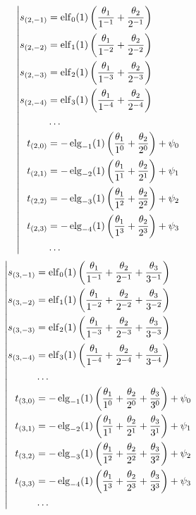 \begin{equation*} \left| \begin{aligned}
s_{(2,-1)} &=
  \elf_0(1) \left(
  \frac{\theta_1}{1^{-1}}
+ \frac{\theta_2}{2^{-1}} \right) \\
%
s_{(2,-2)} &=
  \elf_1(1) \left(
  \frac{\theta_1}{1^{-2}}
+ \frac{\theta_2}{2^{-2}} \right) \\
%
s_{(2,-3)} &=
  \elf_2(1) \left(
  \frac{\theta_1}{1^{-3}}
+ \frac{\theta_2}{2^{-3}} \right) \\
%
s_{(2,-4)} &=
  \elf_3(1) \left(
  \frac{\theta_1}{1^{-4}}
+ \frac{\theta_2}{2^{-4}} \right) \\
%
&\ldots \\
%
t_{(2,0)} &=
- \elg_{-1}(1) \left(
  \frac{\theta_1}{1^0}
+ \frac{\theta_2}{2^0} \right)
+ \psi_0 \\
%
t_{(2,1)} &=
- \elg_{-2}(1) \left(
  \frac{\theta_1}{1^1}
+ \frac{\theta_2}{2^1} \right)
+ \psi_1 \\
%
t_{(2,2)} &=
- \elg_{-3}(1) \left(
  \frac{\theta_1}{1^2}
+ \frac{\theta_2}{2^2} \right)
+ \psi_2 \\
%
t_{(2,3)} &=
- \elg_{-4}(1) \left(
  \frac{\theta_1}{1^3}
+ \frac{\theta_2}{2^3} \right)
+ \psi_3 \\
%
&\ldots \\
\end{aligned} \right. \end{equation*}
%
\begin{equation*} \left| \begin{aligned}
%
s_{(3,-1)} &=
  \elf_0(1) \left(
  \frac{\theta_1}{1^{-1}}
+ \frac{\theta_2}{2^{-1}}
+ \frac{\theta_3}{3^{-1}} \right) \\
%
s_{(3,-2)} &=
  \elf_1(1) \left(
  \frac{\theta_1}{1^{-2}}
+ \frac{\theta_2}{2^{-2}}
+ \frac{\theta_3}{3^{-2}} \right) \\
%
s_{(3,-3)} &=
  \elf_2(1) \left(
  \frac{\theta_1}{1^{-3}}
+ \frac{\theta_2}{2^{-3}}
+ \frac{\theta_3}{3^{-3}} \right) \\
%
s_{(3,-4)} &=
  \elf_3(1) \left(
  \frac{\theta_1}{1^{-4}}
+ \frac{\theta_2}{2^{-4}}
+ \frac{\theta_3}{3^{-4}} \right) \\
%
&\ldots \\
%
t_{(3,0)} &=
- \elg_{-1}(1) \left(
  \frac{\theta_1}{1^0}
+ \frac{\theta_2}{2^0}
+ \frac{\theta_3}{3^0} \right)
+ \psi_0 \\
%
t_{(3,1)} &=
- \elg_{-2}(1) \left(
  \frac{\theta_1}{1^1}
+ \frac{\theta_2}{2^1}
+ \frac{\theta_3}{3^1} \right)
+ \psi_1 \\
%
t_{(3,2)} &=
- \elg_{-3}(1) \left(
  \frac{\theta_1}{1^2}
+ \frac{\theta_2}{2^2}
+ \frac{\theta_3}{3^2} \right)
+ \psi_2 \\
%
t_{(3,3)} &=
- \elg_{-4}(1) \left(
  \frac{\theta_1}{1^3}
+ \frac{\theta_2}{2^3}
+ \frac{\theta_3}{3^3} \right)
+ \psi_3 \\
%
&\ldots \\
\end{aligned} \right. \end{equation*}

